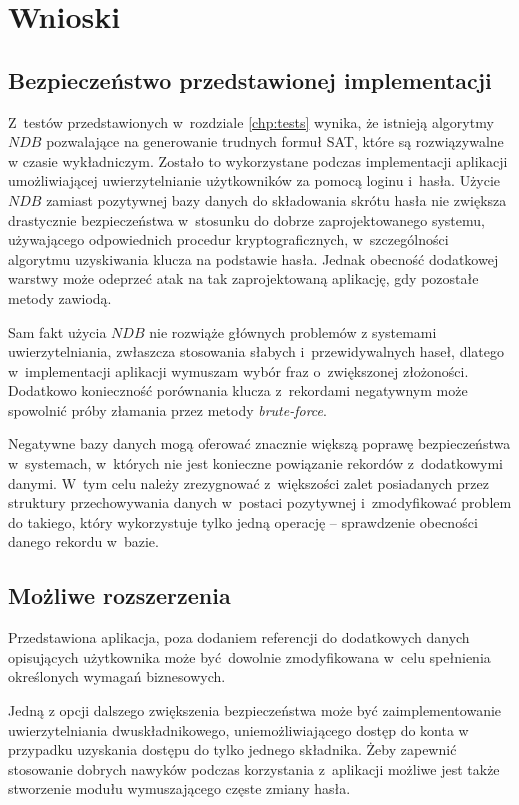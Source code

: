 \chapter{Wnioski}
\label{chp:conclusion}
\section{Bezpieczeństwo przedstawionej implementacji}
Z~testów przedstawionych w~rozdziale \ref{chp:tests} wynika, że istnieją algorytmy $NDB$ pozwalające na generowanie trudnych formuł SAT, które są rozwiązywalne w czasie wykładniczym.
Zostało to wykorzystane podczas implementacji aplikacji umożliwiającej uwierzytelnianie użytkowników za pomocą loginu i~hasła. Użycie $NDB$ zamiast pozytywnej bazy danych do składowania
skrótu hasła nie zwiększa drastycznie bezpieczeństwa w~stosunku do dobrze zaprojektowanego systemu, używającego odpowiednich procedur kryptograficznych, w~szczególności algorytmu uzyskiwania klucza
na podstawie hasła. Jednak obecność dodatkowej warstwy może odeprzeć atak na tak zaprojektowaną aplikację, gdy pozostałe metody zawiodą.

Sam fakt użycia $NDB$ nie rozwiąże głównych problemów z systemami uwierzytelniania, zwłaszcza stosowania słabych i~przewidywalnych haseł, dlatego w~implementacji aplikacji wymuszam wybór fraz o~zwiększonej złożoności.
Dodatkowo konieczność porównania klucza z~rekordami negatywnym może spowolnić próby złamania przez metody \textit{brute-force}.

Negatywne bazy danych mogą oferować znacznie większą poprawę bezpieczeństwa w~systemach, w~których nie jest konieczne powiązanie rekordów z~dodatkowymi danymi.
W~tym celu należy zrezygnować z~większości zalet posiadanych przez struktury przechowywania danych w~postaci pozytywnej i~zmodyfikować problem do takiego, który wykorzystuje tylko jedną operację -- sprawdzenie obecności danego rekordu w~bazie.

\section{Możliwe rozszerzenia}
Przedstawiona aplikacja, poza dodaniem referencji do dodatkowych danych opisujących użytkownika może być dowolnie zmodyfikowana w~celu spełnienia określonych wymagań biznesowych. 

Jedną z opcji dalszego zwiększenia bezpieczeństwa może być zaimplementowanie 
uwierzytelniania dwuskładnikowego, uniemożliwiającego dostęp do konta w przypadku uzyskania dostępu do tylko jednego składnika. Żeby zapewnić stosowanie dobrych nawyków podczas korzystania z~aplikacji możliwe jest także stworzenie modułu wymuszającego częste zmiany hasła.